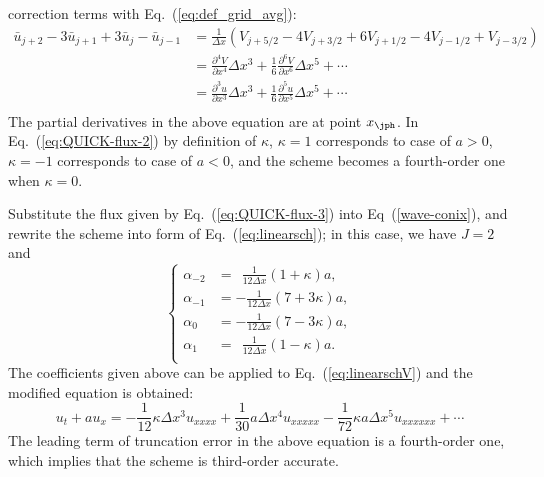 \documentclass[]{article}
\begin{document}
correction terms with Eq.~(\ref{eq:def_grid_avg}): 
\begin{equation*}
  \begin{array}{ll}
    \bar u_{j+2}-3\bar u_{j+1}+3\bar u_{j}-\bar u_{j-1}&
    \displaystyle =\frac{1}{\Delta x}
    \left(V_{j+5/2}-4V_{j+3/2}+6V_{j+1/2}-4V_{j-1/2}+V_{j-3/2}\right) \\[3mm]
    &\displaystyle
    =\frac{\partial^4 V}{\partial x^4}\Delta x^3+\frac{1}{6}\frac{\partial^6V}{\partial x^6}\Delta x^5 + \cdots \\[3mm]
    &\displaystyle
    =\frac{\partial^3 u}{\partial x^3}\Delta x^3+\frac{1}{6}\frac{\partial^5u}{\partial x^5}\Delta x^5 + \cdots \\
  \end{array}
\end{equation*}
The partial derivatives in the above equation are at point $x_\jph$. In
Eq.~(\ref{eq:QUICK-flux-2}) by definition of $\kappa$, $\kappa=1$ corresponds to
case of $a>0$, $\kappa=-1$ corresponds to case of $a<0$, and the scheme becomes
a fourth-order one when $\kappa=0$.

Substitute the flux given by Eq.~(\ref{eq:QUICK-flux-3}) into
Eq~(\ref{wave-conix}), and rewrite the scheme into form of
Eq.~(\ref{eq:linearsch}); in this case, we have $J = 2$ and
\begin{equation}
  \left\{\begin{array}{ll}
  \alpha_{-2}&\displaystyle =\ \ \frac{1}{12\Delta x}(1+\kappa)a,\\[3mm]
  \alpha_{-1}&\displaystyle = -\frac{1}{12\Delta x}(7+3\kappa)a,\\[3mm]
  \alpha_{0}&\displaystyle = -\frac{1}{12\Delta x}(7-3\kappa)a,\\[3mm]
  \alpha_{1}&\displaystyle =\ \ \frac{1}{12\Delta x}(1-\kappa)a.\\
  \end{array}\right.
  \label{eq:coeff-of-alpha-in-quick}
\end{equation}
The coefficients given above can be applied to Eq.~(\ref{eq:linearschV})
and the modified equation is obtained:
\begin{equation}
  u_t+au_x =-\frac{1}{12}\kappa \Delta x^3 u_{xxxx}+\frac{1}{30}a \Delta x^4 u_{xxxxx} -\frac{1}{72} \kappa a \Delta x^5 u_{xxxxxx} +\cdots
  \label{eq:modified-quick}
\end{equation}
The leading term of truncation error in the above equation is a fourth-order
one, which implies that the scheme is third-order accurate.
\end{document}

